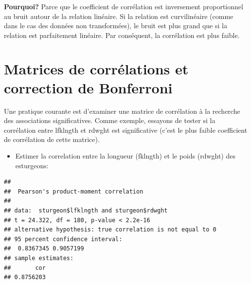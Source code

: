 \documentclass[12pt,]{book}
\newenvironment{Shaded}{\begin{snugshade}}{\end{snugshade}}
\newcommand{\DataTypeTok}[1]{\textcolor[rgb]{0.27,0.27,0.27}{#1}}
\newcommand{\KeywordTok}[1]{\textcolor[rgb]{0.27,0.27,0.27}{\textbf{#1}}}
\newcommand{\NormalTok}[1]{#1}
\newcommand{\OperatorTok}[1]{\textcolor[rgb]{0.43,0.43,0.43}{\textbf{#1}}}
\newcommand{\StringTok}[1]{\textcolor[rgb]{0.5,0.5,0.5}{#1}}
\providecommand{\tightlist}{%
  \setlength{\itemsep}{0pt}\setlength{\parskip}{0pt}}
\begin{document}
\textbf{Pourquoi?} Parce que le coefficient de corrélation est inversement proportionnel au bruit autour de la relation linéaire.
Si la relation est curvilinéaire (comme dans le cas des données non transformées), le bruit est plus grand que si la relation est parfaitement linéaire.
Par conséquent, la corrélation est plus faible.

\hypertarget{matrices-de-corruxe9lations-et-correction-de-bonferroni}{%
\section{Matrices de corrélations et correction de Bonferroni}\label{matrices-de-corruxe9lations-et-correction-de-bonferroni}}

Une pratique courante est d'examiner une matrice de corrélation à la recherche des associations significatives.
Comme exemple, essayons de tester si la corrélation entre lfklngth et rdwght est significative (c'est le plus faible coefficient de corrélation de cette matrice).

\begin{itemize}
\tightlist
\item
  Estimer la correlation entre la longueur (fklngth) et le poids (rdwght) des esturgeons:
\end{itemize}

\begin{Shaded}
\end{Shaded}

\begin{verbatim}
## 
## 	Pearson's product-moment correlation
## 
## data:  sturgeon$lfklngth and sturgeon$rdwght
## t = 24.322, df = 180, p-value < 2.2e-16
## alternative hypothesis: true correlation is not equal to 0
## 95 percent confidence interval:
##  0.8367345 0.9057199
## sample estimates:
##       cor 
## 0.8756203
\end{verbatim}
\end{document}
